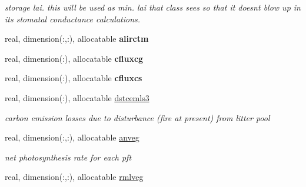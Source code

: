 \begin{DoxyCompactItemize}
\begin{DoxyCompactList}\small\item\em storage lai. this will be used as min. lai that class sees so that it doesn\textquotesingle{}t blow up in its stomatal conductance calculations. \end{DoxyCompactList}\item 
\hypertarget{structctem__statevars_1_1veg__gat_a439347539c6caed5611e790168d00009}{}real, dimension(\+:,\+:), allocatable {\bfseries alirctm}\label{structctem__statevars_1_1veg__gat_a439347539c6caed5611e790168d00009}

\item 
\hypertarget{structctem__statevars_1_1veg__gat_a20ca585c5c9a5b5c60dcdcb6c9fb344f}{}real, dimension(\+:), allocatable {\bfseries cfluxcg}\label{structctem__statevars_1_1veg__gat_a20ca585c5c9a5b5c60dcdcb6c9fb344f}

\item 
\hypertarget{structctem__statevars_1_1veg__gat_aefbe93397c0e2866eb3ec46c302b082c}{}real, dimension(\+:), allocatable {\bfseries cfluxcs}\label{structctem__statevars_1_1veg__gat_aefbe93397c0e2866eb3ec46c302b082c}

\item 
\hypertarget{structctem__statevars_1_1veg__gat_a57250abcb799f3da3e35c43be1578bfd}{}real, dimension(\+:), allocatable \hyperlink{structctem__statevars_1_1veg__gat_a57250abcb799f3da3e35c43be1578bfd}{dstcemls3}\label{structctem__statevars_1_1veg__gat_a57250abcb799f3da3e35c43be1578bfd}

\begin{DoxyCompactList}\small\item\em carbon emission losses due to disturbance (fire at present) from litter pool \end{DoxyCompactList}\item 
\hypertarget{structctem__statevars_1_1veg__gat_afcfa84d09cd5873caea4f6acc1d7d5bd}{}real, dimension(\+:,\+:), allocatable \hyperlink{structctem__statevars_1_1veg__gat_afcfa84d09cd5873caea4f6acc1d7d5bd}{anveg}\label{structctem__statevars_1_1veg__gat_afcfa84d09cd5873caea4f6acc1d7d5bd}

\begin{DoxyCompactList}\small\item\em net photosynthesis rate for each pft \end{DoxyCompactList}\item 
\hypertarget{structctem__statevars_1_1veg__gat_a5f2179983ff14b5333b08c362735c4c9}{}real, dimension(\+:,\+:), allocatable \hyperlink{structctem__statevars_1_1veg__gat_a5f2179983ff14b5333b08c362735c4c9}{rmlveg}\label{structctem__statevars_1_1veg__gat_a5f2179983ff14b5333b08c362735c4c9}


\end{DoxyCompactItemize}
